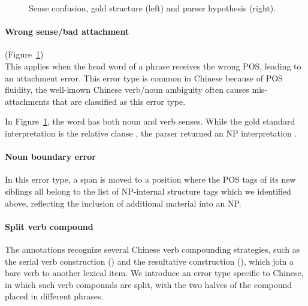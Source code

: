 \begin{figure}
\centering
  \caption[Error analysis example: Word sense confusion (Chinese).]{ \label{fig:sense} 
    Sense confusion, gold structure (left) and parser hypothesis (right).
  }
\end{figure}

\paragraph{Wrong sense/bad attachment} (Figure~\ref{fig:sense}) \\
This applies when the head word of a phrase receives the wrong POS, leading to an attachment error.
This error type is common in Chinese because of POS fluidity, \myeg the well-known Chinese verb/noun ambiguity often causes mis-attachments that are classified as this error type.

In Figure~\ref{fig:sense}, the word \mbox{} has both noun and
verb senses. While the gold standard interpretation is the relative clause
\mbox{}, the parser returned an NP
interpretation \mbox{}.

\paragraph{Noun boundary error}  In this error type, a span is moved to a
position where the POS tags of its new siblings all belong to the
list of NP-internal structure tags which we identified above, reflecting
the inclusion of additional material into an NP.

\paragraph{Split verb compound} The \pctb annotations recognize several
Chinese verb compounding strategies, such as the serial verb construction
(\mbox{}) and the resultative construction
(\mbox{}), which join a bare verb to another
lexical item.  We introduce an error type specific to Chinese, in which such
verb compounds are split, with the two halves of the compound placed in
different phrases.

